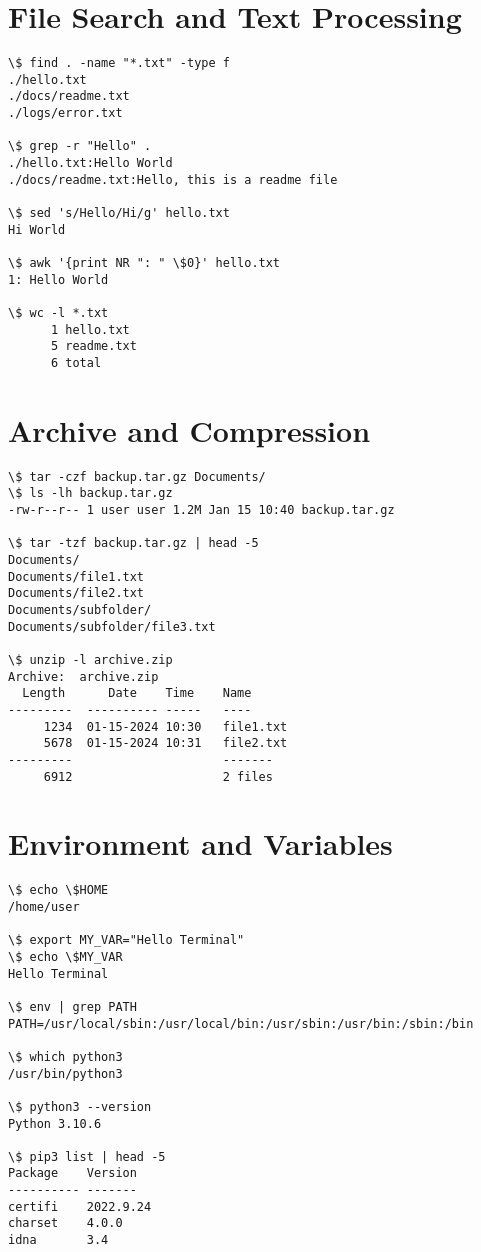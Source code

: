 \section{File Search and Text Processing}

\begin{lstlisting}[style=terminal, caption=Search and Text Operations]
\$ find . -name "*.txt" -type f
./hello.txt
./docs/readme.txt
./logs/error.txt

\$ grep -r "Hello" .
./hello.txt:Hello World
./docs/readme.txt:Hello, this is a readme file

\$ sed 's/Hello/Hi/g' hello.txt
Hi World

\$ awk '{print NR ": " \$0}' hello.txt
1: Hello World

\$ wc -l *.txt
      1 hello.txt
      5 readme.txt
      6 total
\end{lstlisting}

\section{Archive and Compression}

\begin{lstlisting}[style=terminal, caption=Archive Operations]
\$ tar -czf backup.tar.gz Documents/
\$ ls -lh backup.tar.gz
-rw-r--r-- 1 user user 1.2M Jan 15 10:40 backup.tar.gz

\$ tar -tzf backup.tar.gz | head -5
Documents/
Documents/file1.txt
Documents/file2.txt
Documents/subfolder/
Documents/subfolder/file3.txt

\$ unzip -l archive.zip
Archive:  archive.zip
  Length      Date    Time    Name
---------  ---------- -----   ----
     1234  01-15-2024 10:30   file1.txt
     5678  01-15-2024 10:31   file2.txt
---------                     -------
     6912                     2 files
\end{lstlisting}

\section{Environment and Variables}

\begin{lstlisting}[style=terminal, caption=Environment Management]
\$ echo \$HOME
/home/user

\$ export MY_VAR="Hello Terminal"
\$ echo \$MY_VAR
Hello Terminal

\$ env | grep PATH
PATH=/usr/local/sbin:/usr/local/bin:/usr/sbin:/usr/bin:/sbin:/bin

\$ which python3
/usr/bin/python3

\$ python3 --version
Python 3.10.6

\$ pip3 list | head -5
Package    Version
---------- -------
certifi    2022.9.24
charset    4.0.0
idna       3.4
\end{lstlisting}

